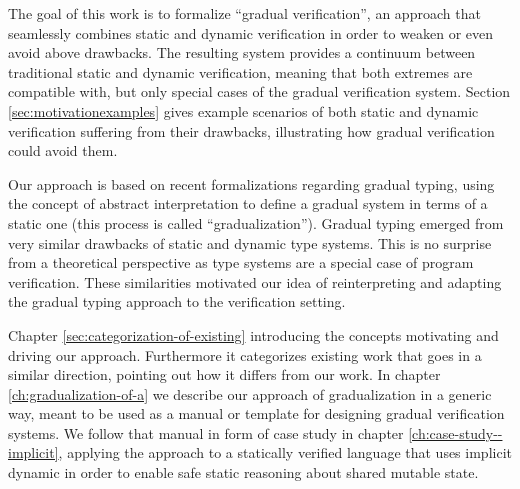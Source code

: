 The goal of this work is to formalize “gradual verification”, an approach that seamlessly combines static and dynamic verification in order to weaken or even avoid above drawbacks.
The resulting system provides a continuum between traditional static and dynamic verification, meaning that both extremes are compatible with, but only special cases of the gradual verification system.
Section \ref{sec:motivationexamples} gives example scenarios of both static and dynamic verification suffering from their drawbacks, illustrating how gradual verification could avoid them.

Our approach is based on recent formalizations regarding gradual typing, using the concept of abstract interpretation to define a gradual system in terms of a static one (this process is called “gradualization”).
Gradual typing emerged from very similar drawbacks of static and dynamic type systems.
This is no surprise from a theoretical perspective as type systems are a special case of program verification. 
These similarities motivated our idea of reinterpreting and adapting the gradual typing approach to the verification setting.

Chapter \ref{sec:categorization-of-existing} introducing the concepts motivating and driving our approach.
Furthermore it categorizes existing work that goes in a similar direction, pointing out how it differs from our work.
In chapter \ref{ch:gradualization-of-a} we describe our approach of gradualization in a generic way, meant to be used as a manual or template for designing gradual verification systems.
We follow that manual in form of case study in chapter \ref{ch:case-study--implicit}, applying the approach to a statically verified language that uses implicit dynamic in order to enable safe static reasoning about shared mutable state.


